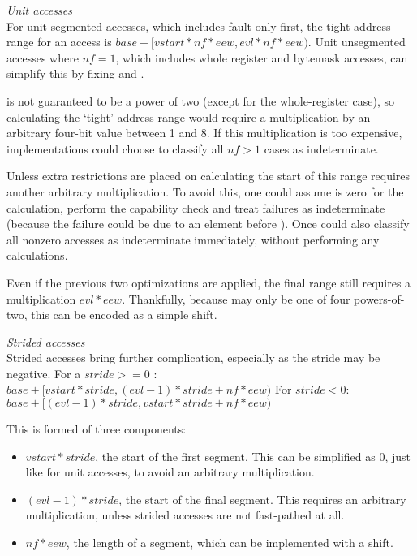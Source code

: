 
\noindent\emph{Unit accesses}\\
\noindent For unit segmented accesses, which includes fault-only first, the tight address range for an access is
$base + [vstart * nf * eew, evl * nf * eew)$.
Unit unsegmented accesses where $nf = 1$, which includes whole register and bytemask accesses, can simplify this by fixing  and .

 is not guaranteed to be a power of two (except for the whole-register case), so calculating the `tight' address range would require a multiplication by an arbitrary four-bit value between 1 and 8.
If this multiplication is too expensive, implementations could choose to classify all $nf > 1$ cases as indeterminate.

Unless extra restrictions are placed on  calculating the start of this range requires another arbitrary multiplication.
To avoid this, one could assume  is zero for the calculation, perform the capability check and treat failures as indeterminate (because the failure could be due to an element before ).
Once could also classify all nonzero  accesses as indeterminate immediately, without performing any calculations.

Even if the previous two optimizations are applied, the final range still requires a multiplication $evl * eew$.
Thankfully, because  may only be one of four powers-of-two, this can be encoded as a simple shift.


\noindent\emph{Strided accesses}\\
\noindent Strided accesses bring further complication, especially as the stride may be negative.
For a $stride >= 0$ : $base + [vstart * stride, (evl - 1) * stride + nf * eew)$
For $stride < 0$: $base + [(evl - 1) * stride, vstart * stride + nf * eew)$

This is formed of three components:
\begin{itemize}
    \item $vstart * stride$, the start of the first segment. This can be simplified as 0, just like for unit accesses, to avoid an arbitrary multiplication.
    \item $(evl - 1) * stride$, the start of the final segment. This requires an arbitrary multiplication, unless strided accesses are not fast-pathed at all.
    \item $nf * eew$, the length of a segment, which can be implemented with a shift.
\end{itemize}

